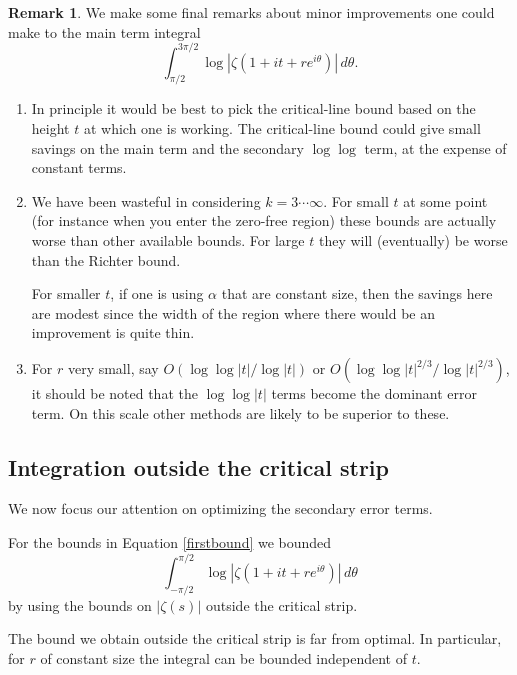 \documentclass[10pt,english,letter, reqno]{amsart}
\theoremstyle{plain}
\theoremstyle{definition}
\newtheorem{remark}[theorem]{Remark}
\begin{document}
\begin{remark}
    We make some final remarks about minor improvements one could make to the main term integral
    \[\int_{\pi/2}^{3\pi/2} \log|\zeta(1+it+re^{i\theta})|\,d\theta . \]
\begin{enumerate}
    \item In principle it would be best to pick the critical-line bound based on the height $t$ at which one is working.
    The critical-line bound could give small savings on the main term and the secondary $\log\log$ term, at the expense of constant terms.
    
    \item We have been wasteful in considering $k=3\cdots\infty$. For small $t$ at some point (for instance when you enter the zero-free region) these bounds are actually worse than other available bounds. For large $t$ they will (eventually) be worse than the Richter bound.

    For smaller $t$, if one is using $\alpha$ that are constant size, then the savings here are modest since the width of the region where there would be an improvement is quite thin. 
    
    \item For $r$ very small, say $O(\log\log|t|/\log|t|)$ or  $O(\log\log|t|^{2/3}/\log|t|^{2/3})$, it should be noted that the $\log\log|t|$ terms become the dominant error term. On this scale other methods are likely to be superior to these.
\end{enumerate}
    
\end{remark}


\subsection{Integration outside the critical strip}\label{sec:refinement-integration}
We now focus our attention on optimizing the secondary error terms.

For the bounds in Equation \eqref{firstbound} we bounded
\[ \int_{-\pi/2}^{\pi/2}  \log|\zeta(1+it+re^{i\theta})|\,d\theta  \]
by using the bounds on $|\zeta(s)|$ outside the critical strip.

The bound we obtain outside the critical strip is far from optimal. In particular, for $r$ of constant size the integral can be bounded independent of $t$. 
\end{document}
